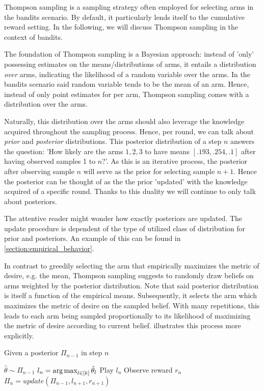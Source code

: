 Thompson sampling is a sampling strategy often employed for selecting arms in
the bandits scenario. By default, it particularly lends itself to the cumulative
reward setting. In the following, we will discuss Thompson sampling in the
context of bandits.

The foundation of Thompson sampling is a Bayesian approach: instead of 'only'
possessing estimates on the means/distributions of arms, it entails a
distribution \emph{over} arms, indicating the likelihood of a random variable
over the arms. In the bandits scenario said random variable tends to be the mean
of an arm. Hence, instead of only point estimates for per arm, Thompson sampling comes with a distribution over the arms.

Naturally, this distribution over the arms should also leverage the knowledge
acquired throughout the sampling process. Hence, per round, we can talk about
\emph{prior} and \emph{posterior} distributions. This posterior distribution of
a step $n$ answers the question: 'How likely are the arms $1, 2, 3$ to have
means $[.193, .254, .1]$ after having observed samples 1 to $n$?'. As this is an
iterative process, the posterior after observing sample $n$ will serve as the
prior for selecting sample $n+1$. Hence the posterior can be thought of as the
the prior 'updated' with the knowledge acquired of a specific round. Thanks to
this duality we will continue to only talk about posteriors.

The attentive reader might wonder how exactly posteriors are updated. The update
procedure is dependent of the type of utilized class of distribution for prior
and posteriors. An example of this can be found in
\ref{section:empirical_behavior}.

In contrast to greedily selecting the arm that empirically maximizes the metric
of desire, e.g. the mean, Thompson sampling suggests to randomly draw beliefs on
arms weighted by the posterior distribution. Note that said posterior
distribution is itself a function of the empirical means. Subsequently, it
selects the arm which maximizes the metric of desire on the sampled belief. With
many repetitions, this leads to each arm being sampled proportionally to its
likelihood of maximizing the metric of desire according to current belief.
 illustrates this process more explicitly.

\begin{algorithm}[H]
    \caption{Given a posterior $\Pi_{n-1}$ in step $n$}
    \label{alg:thompson_sampling}
  \begin{algorithmic}
    \State $\hat{\theta} \sim \Pi_{n-1}$
    \State $l_n = \operatorname*{arg\,max}_{l \in [k]}\hat{\theta}_l$
    \State Play $l_n$
    \State Observe reward $r_n$
    \State $\Pi_n = update(\Pi_{n-1}, l_{n+1}, r_{n+1})$
  \end{algorithmic}
\end{algorithm}

